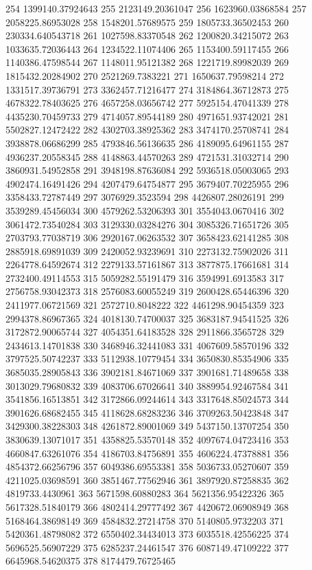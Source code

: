 {254 1399140.37924643
255 2123149.20361047
256 1623960.03868584
257 2058225.86953028
258 1548201.57689575
259 1805733.36502453
260 230334.640543718
261 1027598.83370548
262 1200820.34215072
263 1033635.72036443
264 1234522.11074406
265 1153400.59117455
266 1140386.47598544
267 1148011.95121382
268 1221719.89982039
269 1815432.20284902
270 2521269.7383221
271 1650637.79598214
272 1331517.39736791
273 3362457.71216477
274 3184864.36712873
275 4678322.78403625
276 4657258.03656742
277 5925154.47041339
278 4435230.70459733
279 4714057.89544189
280 4971651.93742021
281 5502827.12472422
282 4302703.38925362
283 3474170.25708741
284 3938878.06686299
285 4793846.56136635
286 4189095.64961155
287 4936237.20558345
288 4148863.44570263
289 4721531.31032714
290 3860931.54952858
291 3948198.87636084
292 5936518.05003065
293 4902474.16491426
294 4207479.64754877
295 3679407.70225955
296 3358433.72787449
297 3076929.3523594
298 4426807.28026191
299 3539289.45456034
300 4579262.53206393
301 3554043.0670416
302 3061472.73540284
303 3129330.03284276
304 3085326.71651726
305 2703793.77038719
306 2920167.06263532
307 3658423.62141285
308 2885918.69891039
309 2420052.93239691
310 2273132.75902026
311 2264778.64592674
312 2279133.57161867
313 3877875.17661681
314 2732400.49114553
315 5059282.55191479
316 3594991.6913583
317 2756758.93042373
318 2576083.60055249
319 2600428.65446396
320 2411977.06721569
321 2572710.8048222
322 4461298.90454359
323 2994378.86967365
324 4018130.74700037
325 3683187.94541525
326 3172872.90065744
327 4054351.64183528
328 2911866.3565728
329 2434613.14701838
330 3468946.32441083
331 4067609.58570196
332 3797525.50742237
333 5112938.10779454
334 3650830.85354906
335 3685035.28905843
336 3902181.84671069
337 3901681.71489658
338 3013029.79680832
339 4083706.67026641
340 3889954.92467584
341 3541856.16513851
342 3172866.09244614
343 3317648.85024573
344 3901626.68682455
345 4118628.68283236
346 3709263.50423848
347 3429300.38228303
348 4261872.89001069
349 5437150.13707254
350 3830639.13071017
351 4358825.53570148
352 4097674.04723416
353 4660847.63261076
354 4186703.84756891
355 4606224.47378881
356 4854372.66256796
357 6049386.69553381
358 5036733.05270607
359 4211025.03698591
360 3851467.77562946
361 3897920.87258835
362 4819733.4430961
363 5671598.60880283
364 5621356.95422326
365 5617328.51840179
366 4802414.29777492
367 4420672.06908949
368 5168464.38698149
369 4584832.27214758
370 5140805.9732203
371 5420361.48798082
372 6550402.34434013
373 6035518.42556225
374 5696525.56907229
375 6285237.24461547
376 6087149.47109222
377 6645968.54620375
378 8174479.76725465
}
